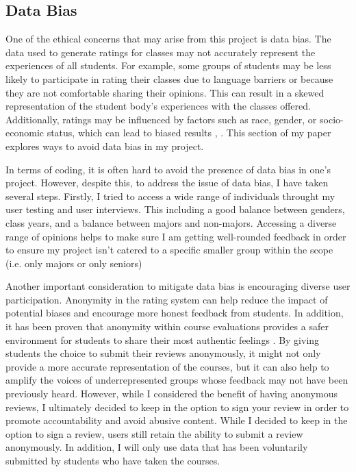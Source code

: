 \documentclass[10pt,twocolumn]{article}
\begin{document}
\subsection{Data Bias}
One of the ethical concerns that may arise from this project is data bias. The data used to generate ratings for classes may not accurately represent the experiences of all students. For example, some groups of students may be less likely to participate in rating their classes due to language barriers or because they are not comfortable sharing their opinions. This can result in a skewed representation of the student body's experiences with the classes offered. Additionally, ratings may be influenced by factors such as race, gender, or socio-economic status, which can lead to biased results \cite{dubrovina23}, \cite{chae17}. This section of my paper explores ways to avoid data bias in my project.

In terms of coding, it is often hard to avoid the presence of data bias in one's project. However, despite this, to address the issue of data bias, I have taken several steps. Firstly, I tried to access a wide range of individuals throught my user testing and user interviews. This including a good balance between genders, class years, and a balance between majors and non-majors. Accessing a diverse range of opinions helps to make sure I am getting well-rounded feedback in order to ensure my project isn't catered to a specific smaller group within the scope (i.e. only majors or only seniors)

Another important consideration to mitigate data bias is encouraging diverse user participation. Anonymity in the rating system can help reduce the impact of potential biases and encourage more honest feedback from students. In addition, it has been proven that anonymity within course evaluations provides a safer environment for students to share their most authentic feelings \cite{ellis1984}. By giving students the choice to submit their reviews anonymously, it might not only provide a more accurate representation of the courses, but it can also help to amplify the voices of underrepresented groups whose feedback may not have been previously heard. However, while I considered the benefit of having anonymous reviews, I ultimately decided to keep in the option to sign your review in order to promote accountability and avoid abusive content. While I decided to keep in the option to sign a review, users still retain the ability to submit a review anonymously. In addition, I will only use data that has been voluntarily submitted by students who have taken the courses. 
\end{document}
